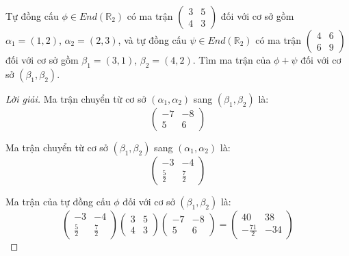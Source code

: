 \documentclass[class=nhvh-linear-algebra,crop=false]{standalone}
\begin{document}
\begin{exercise}
    Tự đồng cấu $\phi\in End(\mathbb{R}_{2})$ có ma trận $\begin{pmatrix}3 & 5 \\ 4 & 3\end{pmatrix}$ đối với cơ sở gồm $\alpha_{1} = (1, 2)$, $\alpha_{2} = (2, 3)$, và tự đồng cấu $\psi\in End(\mathbb{R}_{2})$ có ma trận $\begin{pmatrix}4 & 6 \\ 6 & 9 \end{pmatrix}$ đối với cơ sở gồm $\beta_{1} = (3, 1)$, $\beta_{2} = (4, 2)$. Tìm ma trận của $\phi + \psi$ đối với cơ sở $(\beta_{1}, \beta_{2})$.
\end{exercise}

\begin{proof}[Lời giải]
    \par Ma trận chuyển từ cơ sở $(\alpha_{1}, \alpha_{2})$ sang $(\beta_{1}, \beta_{2})$ là:
    \[
        \begin{pmatrix}
            -7 & -8 \\
            5  & 6
        \end{pmatrix}
    \]
    \par Ma trận chuyển từ cơ sở $(\beta_{1}, \beta_{2})$ sang $(\alpha_{1}, \alpha_{2})$ là:
    \[
        \begin{pmatrix}
            -3          & -4          \\
            \frac{5}{2} & \frac{7}{2}
        \end{pmatrix}
    \]
    \par Ma trận của tự đồng cấu $\phi$ đối với cơ sở $(\beta_{1}, \beta_{2})$ là:
    \[
        \begin{pmatrix}
            -3          & -4          \\
            \frac{5}{2} & \frac{7}{2}
        \end{pmatrix}
        \begin{pmatrix}
            3 & 5 \\
            4 & 3
        \end{pmatrix}
        \begin{pmatrix}
            -7 & -8 \\
            5  & 6
        \end{pmatrix}
        =
        \begin{pmatrix}
            40            & 38  \\
            -\frac{71}{2} & -34
        \end{pmatrix}
\]
\end{proof}
\end{document}
